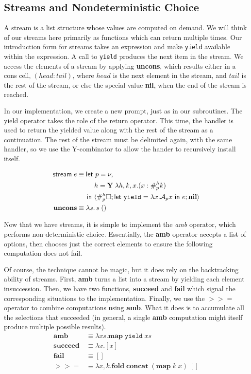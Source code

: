 \documentclass[11pt]{article}
\newcommand{\maybePage}{\newpage}
\newcommand\x{\lambda x}
\newcommand{\letin}[2]{\textsf{let }#1\textsf{ in }#2}
\newcommand\A{\mathcal{A}}
\newcommand{\angles}[1]{\langle#1\rangle}
\begin{document}
\maybePage
\subsection{Streams and Nondeterministic Choice}

A stream is a list structure whose values are computed on demand.\cite{SICP}
We will think of our streams here primarily as functions which can return multiple times.
Our introduction form for streams takes an expression and make \texttt{yield} available within the expression.
A call to \texttt{yield} produces the next item in the stream.
We access the elements of a stream by applying \textbf{uncons}, which results either in a cons cell, $(head:tail)$, where $head$ is the next element in the stream, and $tail$ is the rest of the stream, or else the special value \textbf{nil}, when the end of the stream is reached.

In our implementation, we create a new prompt, just as in our subroutines.
The yield operator takes the role of the return operator.
This time, the handler is used to return the yielded value along with the rest of the stream as a continuation.
The rest of the stream must be delimited again, with the same handler, so we use the Y-combinator to allow the hander to recursively install itself.

\begin{align*}
\textsf{stream}\;e &\equiv{}
\textsf{let }p = \nu, \\
  &\qquad\;\; h = \textbf Y\;\lambda h,k,x.(x:\#_p^hk) \\
  &\quad\;\,\textsf{in }
  \angles{\#_p^{h}\square; \letin{\texttt{yield}=\x.{\A_px}}{e}; \textbf{nil}} \\
\textbf{uncons} &\equiv \lambda s.\,s\;() \\
\end{align*}

Now that we have streams, it is simple to implement the \emph{amb} operator, which performs non-deterministic choice.
Essentially, the \textbf{amb} operator accepts a list of options, then chooses just the correct elements to ensure the following computation does not fail.

Of course, the technique cannot be magic, but it does rely on the backtracking ability of streams.
First, \textbf{amb} turns a list into a stream by yielding each element insuccession.
Then, we have two functions, \textbf{succeed} and \textbf{fail} which signal the corresponding situations to the implementation.
Finally, we use the $>\!>=$ operator to combine computations using \textbf{amb}.
What it does is to accumulate all the selections that succeeded (in general, a single \textbf{amb} computation might itself produce multiple possible results).
\begin{align*}
\textbf{amb} &\equiv \x s. \textbf{map}\;\texttt{yield}\;xs \\
\textbf{succeed} &\equiv \x. [x] \\
\textbf{fail} &\equiv [] \\
>\!>= &\equiv \lambda x,k. \textbf{fold}\;\textbf{concat}\;(\textbf{map}\;k\;x)\;[] \\
\end{align*}
\end{document}
